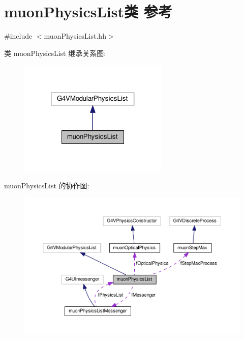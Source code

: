 \hypertarget{classmuonPhysicsList}{}\section{muon\+Physics\+List类 参考}
\label{classmuonPhysicsList}


{\ttfamily \#include $<$muon\+Physics\+List.\+hh$>$}



类 muon\+Physics\+List 继承关系图\+:\nopagebreak
\begin{figure}[H]
\begin{center}
\leavevmode
\includegraphics[width=202pt]{classmuonPhysicsList__inherit__graph}
\end{center}
\end{figure}


muon\+Physics\+List 的协作图\+:\nopagebreak
\begin{figure}[H]
\begin{center}
\leavevmode
\includegraphics[width=350pt]{classmuonPhysicsList__coll__graph}
\end{center}
\end{figure}
